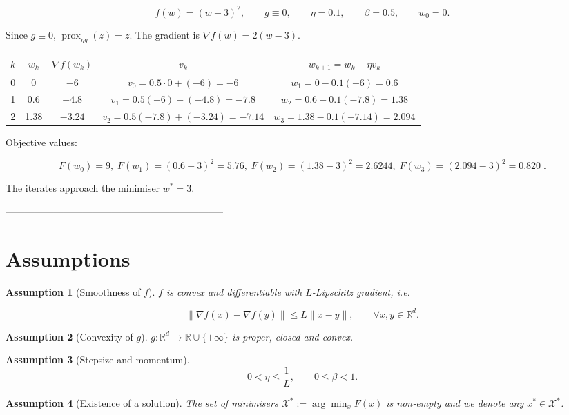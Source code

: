 \documentclass{article}
\newtheorem{assumption}{Assumption}
\newcommand{\prox}{\operatorname{prox}}
\newcommand{\R}{\mathbb{R}}
\begin{document}
\[
f(w)=(w-3)^{2},\qquad g\equiv0,\qquad \eta=0.1,\qquad \beta=0.5,
\qquad w_{0}=0.
\]

Since \(g\equiv0\), \(\prox_{\eta g}(z)=z\).  
The gradient is \(\nabla f(w)=2(w-3)\).

\begin{center}
\begin{tabular}{c|c|c|c|c}
\(k\) & \(w_{k}\) & \(\nabla f(w_{k})\) & \(v_{k}\) & \(w_{k+1}=w_{k}-\eta v_{k}\)\\\hline
0 & 0 & \(-6\) & \(v_{0}=0.5\cdot0+(-6)=-6\) & \(w_{1}=0-0.1(-6)=0.6\)\\
1 & 0.6 & \(-4.8\) & \(v_{1}=0.5(-6)+(-4.8)=-7.8\) & \(w_{2}=0.6-0.1(-7.8)=1.38\)\\
2 & 1.38 & \(-3.24\) & \(v_{2}=0.5(-7.8)+(-3.24)=-7.14\) & \(w_{3}=1.38-0.1(-7.14)=2.094\)
\end{tabular}
\end{center}

Objective values:  

\[
F(w_{0})=9,\;F(w_{1})=(0.6-3)^{2}=5.76,\;
F(w_{2})=(1.38-3)^{2}=2.6244,\;
F(w_{3})=(2.094-3)^{2}=0.820\;.
\]

The iterates approach the minimiser \(w^{*}=3\).

--------------------------------------------------------------------

\section*{Assumptions}
\begin{assumption}[Smoothness of \(f\)]
\(f\) is convex and differentiable with \(L\)-Lipschitz gradient, i.e.  

\[
\|\nabla f(x)-\nabla f(y)\|\le L\|x-y\|,\qquad\forall x,y\in\R^{d}. \tag{A1}
\]
\end{assumption}

\begin{assumption}[Convexity of \(g\)]
\(g:\R^{d}\to\R\cup\{+\infty\}\) is proper, closed and convex. 
\end{assumption}

\begin{assumption}[Stepsize and momentum]
\[
0<\eta\le\frac{1}{L},\qquad 0\le\beta<1. \tag{A3}
\]
\end{assumption}

\begin{assumption}[Existence of a solution]
The set of minimisers  
\(\mathcal{X}^{*}:=\arg\min_{x}F(x)\) is non‑empty and we denote any
\(x^{*}\in\mathcal{X}^{*}\). 
\end{assumption}
\end{document}
